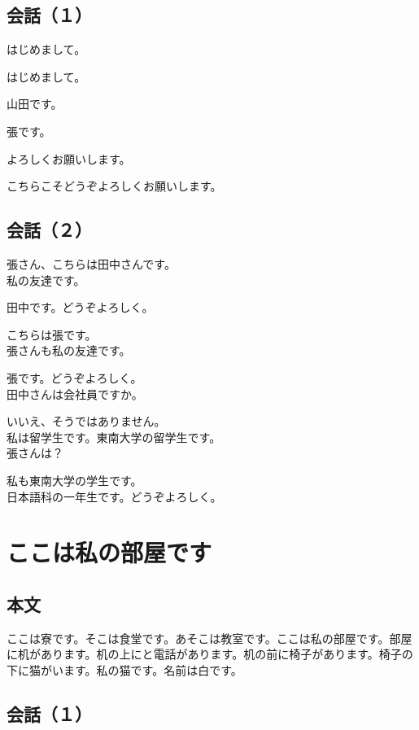 \documentclass[a5j]{ltjarticle}
\newcommand*{\YamadaSpeaks}{\item[山田：]}
\newcommand*{\ZhangSpeaks}{\item[張：]}
\newcommand*{\TanakaSpeaks}{\item[田中：]}
\begin{document}
\subsection*{会話（１）}

\begin{dialogue}
  \YamadaSpeaks
  はじめまして。
  \ZhangSpeaks
  はじめまして。
  \YamadaSpeaks
  山田です。
  \ZhangSpeaks
  張です。
  \YamadaSpeaks
  よろしくお願いします。
  \ZhangSpeaks
  こちらこそどうぞよろしくお願いします。
\end{dialogue}

\subsection*{会話（２）}

\begin{dialogue}
  \YamadaSpeaks
  張さん、こちらは田中さんです。\\
  私の友達です。
  \TanakaSpeaks
  田中です。どうぞよろしく。
  \YamadaSpeaks
  こちらは張です。\\
  張さんも私の友達です。
  \ZhangSpeaks
  張です。どうぞよろしく。\\
  田中さんは会社員ですか。
  \TanakaSpeaks
  いいえ、そうではありません。\\
  私は留学生です。東南大学の留学生です。\\
  張さんは？
  \ZhangSpeaks
  私も東南大学の学生です。\\
  日本語科の一年生です。どうぞよろしく。
\end{dialogue}

\section{ここは私の部屋です}

\subsection*{本文}

ここは寮です。そこは食堂です。あそこは教室です。ここは私の部屋です。部屋に机があります。机の上にと電話があります。机の前に椅子があります。椅子の下に猫がいます。私の猫です。名前は白です。

\subsection*{会話（１）}
\end{document}
